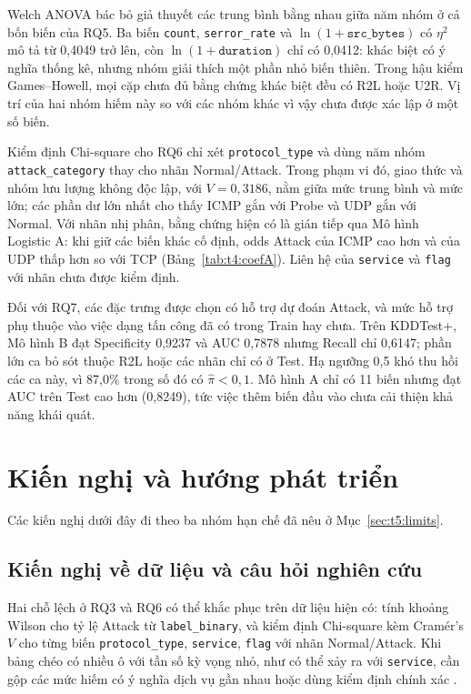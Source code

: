 \documentclass[../main.tex]{subfiles}
\begin{document}
Welch ANOVA bác bỏ giả thuyết các trung bình bằng nhau giữa năm nhóm ở cả bốn biến của RQ5. Ba biến \texttt{count}, \texttt{serror\_rate} và $\ln(1+\texttt{src\_bytes})$ có $\eta^2$ mô tả từ 0,4049 trở lên, còn $\ln(1+\texttt{duration})$ chỉ có 0,0412: khác biệt có ý nghĩa thống kê, nhưng nhóm giải thích một phần nhỏ biến thiên. Trong hậu kiểm Games--Howell, mọi cặp chưa đủ bằng chứng khác biệt đều có R2L hoặc U2R. Vị trí của hai nhóm hiếm này so với các nhóm khác vì vậy chưa được xác lập ở một số biến.

Kiểm định Chi-square cho RQ6 chỉ xét \texttt{protocol\_type} và dùng năm nhóm \texttt{attack\_category} thay cho nhãn Normal/Attack. Trong phạm vi đó, giao thức và nhóm lưu lượng không độc lập, với $V=0{,}3186$, nằm giữa mức trung bình và mức lớn; các phần dư lớn nhất cho thấy ICMP gắn với Probe và UDP gắn với Normal. Với nhãn nhị phân, bằng chứng hiện có là gián tiếp qua Mô hình Logistic A: khi giữ các biến khác cố định, odds Attack của ICMP cao hơn và của UDP thấp hơn so với TCP (Bảng~\ref{tab:t4:coefA}). Liên hệ của \texttt{service} và \texttt{flag} với nhãn chưa được kiểm định.

Đối với RQ7, các đặc trưng được chọn có hỗ trợ dự đoán Attack, và mức hỗ trợ phụ thuộc vào việc dạng tấn công đã có trong Train hay chưa. Trên KDDTest+, Mô hình B đạt Specificity 0,9237 và AUC 0,7878 nhưng Recall chỉ 0,6147; phần lớn ca bỏ sót thuộc R2L hoặc các nhãn chỉ có ở Test. Hạ ngưỡng 0,5 khó thu hồi các ca này, vì 87,0\% trong số đó có $\hat\pi<0{,}1$. Mô hình A chỉ có 11 biến nhưng đạt AUC trên Test cao hơn (0,8249), tức việc thêm biến đầu vào chưa cải thiện khả năng khái quát.

\section{Kiến nghị và hướng phát triển}
\label{sec:t5:recommend}

Các kiến nghị dưới đây đi theo ba nhóm hạn chế đã nêu ở Mục~\ref{sec:t5:limits}.

\subsection{Kiến nghị về dữ liệu và câu hỏi nghiên cứu}
Hai chỗ lệch ở RQ3 và RQ6 có thể khắc phục trên dữ liệu hiện có: tính khoảng Wilson cho tỷ lệ Attack từ \texttt{label\_binary}, và kiểm định Chi-square kèm Cramér's $V$ cho từng biến \texttt{protocol\_type}, \texttt{service}, \texttt{flag} với nhãn Normal/Attack. Khi bảng chéo có nhiều ô với tần số kỳ vọng nhỏ, như có thể xảy ra với \texttt{service}, cần gộp các mức hiếm có ý nghĩa dịch vụ gần nhau hoặc dùng kiểm định chính xác \cite{task34_cochran1954,task34_kim2017}.
\end{document}
